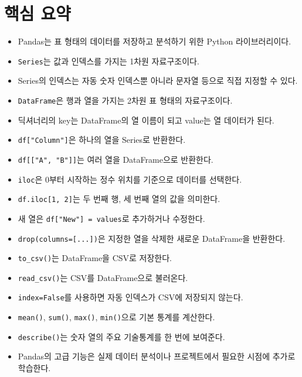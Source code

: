 \documentclass[11pt,a4paper]{article}
\begin{document}
\section{핵심 요약}

\begin{itemize}[leftmargin=1.5em]
    \item Pandas는 표 형태의 데이터를 저장하고 분석하기 위한 Python 라이브러리이다.
    \item \texttt{Series}는 값과 인덱스를 가지는 1차원 자료구조이다.
    \item Series의 인덱스는 자동 숫자 인덱스뿐 아니라 문자열 등으로 직접 지정할 수 있다.
    \item \texttt{DataFrame}은 행과 열을 가지는 2차원 표 형태의 자료구조이다.
    \item 딕셔너리의 key는 DataFrame의 열 이름이 되고 value는 열 데이터가 된다.
    \item \texttt{df["Column"]}은 하나의 열을 Series로 반환한다.
    \item \texttt{df[["A", "B"]]}는 여러 열을 DataFrame으로 반환한다.
    \item \texttt{iloc}은 0부터 시작하는 정수 위치를 기준으로 데이터를 선택한다.
    \item \texttt{df.iloc[1, 2]}는 두 번째 행, 세 번째 열의 값을 의미한다.
    \item 새 열은 \texttt{df["New"] = values}로 추가하거나 수정한다.
    \item \texttt{drop(columns=[...])}은 지정한 열을 삭제한 새로운 DataFrame을 반환한다.
    \item \texttt{to\_csv()}는 DataFrame을 CSV로 저장한다.
    \item \texttt{read\_csv()}는 CSV를 DataFrame으로 불러온다.
    \item \texttt{index=False}를 사용하면 자동 인덱스가 CSV에 저장되지 않는다.
    \item \texttt{mean()}, \texttt{sum()}, \texttt{max()}, \texttt{min()}으로 기본 통계를 계산한다.
    \item \texttt{describe()}는 숫자 열의 주요 기술통계를 한 번에 보여준다.
    \item Pandas의 고급 기능은 실제 데이터 분석이나 프로젝트에서 필요한 시점에 추가로 학습한다.
\end{itemize}
\end{document}
